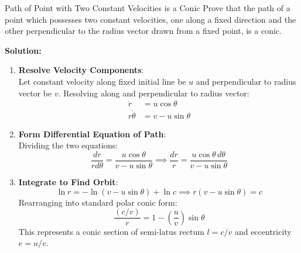 \begin{examplebox}{Path of Point with Two Constant Velocities is a Conic}
Prove that the path of a point which possesses two constant velocities, one along a fixed direction and the other perpendicular to the radius vector drawn from a fixed point, is a conic.

\tcblower
\textbf{Solution:}

\begin{enumerate}[leftmargin=1.5em]
    \item \textbf{Resolve Velocity Components}:\\
    Let constant velocity along fixed initial line be $u$ and perpendicular to radius vector be $v$.
    Resolving along and perpendicular to radius vector:
    \begin{align*}
        \dot{r} &= u \cos\theta \\
        r \dot{\theta} &= v - u \sin\theta
    \end{align*}

    \item \textbf{Form Differential Equation of Path}:\\
    Dividing the two equations:
    \begin{equation*}
        \frac{dr}{r d\theta} = \frac{u \cos\theta}{v - u \sin\theta} \implies \frac{dr}{r} = \frac{u \cos\theta \, d\theta}{v - u \sin\theta}
    \end{equation*}

    \item \textbf{Integrate to Find Orbit}:\\
    \begin{equation*}
        \ln r = -\ln(v - u \sin\theta) + \ln c \implies r(v - u \sin\theta) = c
    \end{equation*}
    Rearranging into standard polar conic form:
    \begin{equation*}
        \frac{(c/v)}{r} = 1 - \left(\frac{u}{v}\right) \sin\theta
    \end{equation*}
    This represents a conic section of semi-latus rectum $l = c/v$ and eccentricity $e = u/v$.
\end{enumerate}
\end{examplebox}

